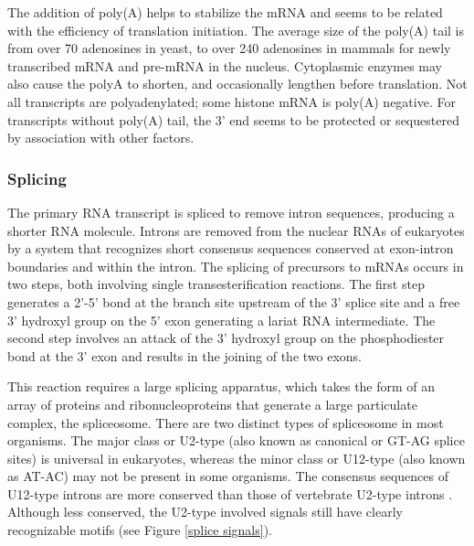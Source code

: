 The addition of poly(A) helps to stabilize the mRNA and seems to be
related with the efficiency of translation initiation. The average
size of the poly(A) tail is from over 70 adenosines in yeast, to over
240 adenosines in mammals for newly transcribed mRNA and pre-mRNA in
the nucleus. Cytoplasmic enzymes may also cause the polyA to shorten,
and occasionally lengthen before translation. Not all transcripts are
polyadenylated; some histone mRNA is poly(A) negative. For transcripts
without poly(A) tail, the 3' end seems to be protected or sequestered
by association with other factors.

\subsubsection{Splicing}

The primary RNA transcript is spliced to remove intron sequences,
producing a shorter RNA molecule. Introns are removed from the nuclear
RNAs of eukaryotes by a system that recognizes short consensus
sequences conserved at exon-intron boundaries and within the
intron. The splicing of precursors to mRNAs occurs in two steps, both
involving single transesterification reactions. The first step
generates a 2'-5' bond at the branch site upstream of the 3' splice
site and a free 3' hydroxyl group on the 5' exon generating a lariat
RNA intermediate. The second step involves an attack of the 3'
hydroxyl group on the phosphodiester bond at the 3' exon and results
in the joining of the two exons.


This reaction requires a large splicing apparatus, which takes the
form of an array of proteins and ribonucleoproteins that generate a
large particulate complex, the spliceosome. There are two distinct
types of spliceosome in most organisms. The major class or U2-type
(also known as canonical or GT-AG splice sites) is universal in
eukaryotes, whereas the minor class or U12-type (also known as AT-AC)
may not be present in some organisms. The consensus sequences of
U12-type introns are more conserved than those of vertebrate
U2-type introns \citep{sharp:1997a}. Although less conserved, the
U2-type involved signals still have clearly recognizable motifs (see
Figure \ref{splice signals}).

